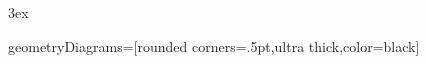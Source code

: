 \makeatletter
\let\c@definition\relax
\let\c@warning\relax
\makeatother
\let\definition\relax
\let\enddefinition\relax

\let\warning\relax
\let\endwarning\relax

		{}                              %
		{}                              %
		{\bfseries}            %
		{}                              %
		{3ex}                           %
		{}%
\theoremstyle{Definition}
\newtheorem{definition}{Definition}
\newtheorem{warning}{Warning}




\newcommand{\snap}{{\bfseries\itshape\textsf{Snap!}}}
\newcommand{\flavor}{\link[\snap]{https://snap.berkeley.edu/}}
\newcommand{\mooculus}{\textsf{\textbf{MOOC}\textnormal{\textsf{ULUS}}}}
\newcommand{\stringstar}[2]{\left\{\frac{#1}{#2}\right\}}



\usepackage{tkz-euclide}
\tikzstyle geometryDiagrams=[rounded corners=.5pt,ultra thick,color=black]



\ifhandout\newcommand{\mynewpage}{\newpage}\else\newcommand{\mynewpage}{}\fi


\usetikzlibrary{cd}




\def\binomialCoefficient#1#2{%
  \the\numexpr 1\expandafter\bKN\expandafter{\the\numexpr #2\relax}{#1}\relax}
\def\bKN#1#2{%
  \ifnum #1<0 *0%
  \else    \ifnum 0<\numexpr 2*#1-(#2)\relax \expandafter\bKN\expandafter{\the\numexpr #2-(#1)\relax}{#2}%
           \else  \bkNK 1{#2}{#1}\fi\fi}
\def\bkNK#1#2#3{%
  \ifnum #1>#3 %
  \else  *(#2)/#1\expandafter\bNkKfi\expandafter{\the\numexpr#2-1\relax}{#1+1}{#3}%
  \fi}      %
\def\bNkKfi#1#2#3#4{%
 #4\expandafter\bkNK\expandafter{\the\numexpr#2\relax}{#1}{#3}}












